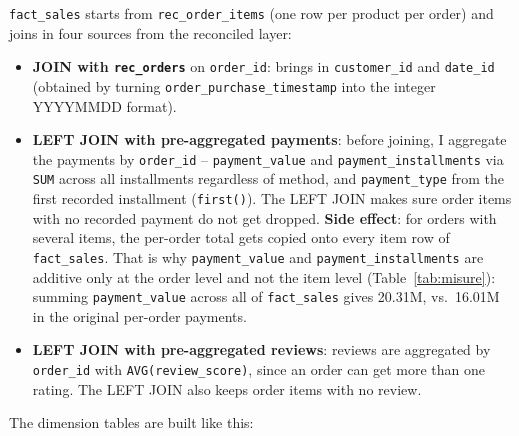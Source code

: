 \documentclass[12pt,a4paper]{article}
\begin{document}
\texttt{fact\_sales} starts from \texttt{rec\_order\_items} (one row per product per
order) and joins in four sources from the reconciled layer:

\begin{itemize}
\sloppy
  \item \textbf{JOIN with \texttt{rec\_orders}} on \texttt{order\_id}: brings in
        \texttt{customer\_id} and \texttt{date\_id} (obtained by turning
        \texttt{order\_purchase\_timestamp} into the integer YYYYMMDD format).

  \item \textbf{LEFT JOIN with pre-aggregated payments}: before joining, I aggregate
        the payments by \texttt{order\_id} -- \texttt{payment\_value} and
        \texttt{payment\_installments} via \texttt{SUM} across all installments
        regardless of method, and \texttt{payment\_type} from the first recorded
        installment (\texttt{first()}). The LEFT JOIN makes sure order items with no
        recorded payment do not get dropped. \textbf{Side effect}: for orders with
        several items, the per-order total gets copied onto every item row of
        \texttt{fact\_sales}. That is why \texttt{payment\_value} and
        \texttt{payment\_installments} are additive only at the order level and not
        the item level (Table~\ref{tab:misure}): summing \texttt{payment\_value}
        across all of \texttt{fact\_sales} gives 20.31M, vs.\ 16.01M in the original
        per-order payments.

  \item \textbf{LEFT JOIN with pre-aggregated reviews}: reviews are aggregated by
        \texttt{order\_id} with \texttt{AVG(review\_score)}, since an order can get
        more than one rating. The LEFT JOIN also keeps order items with no review.
\end{itemize}

The dimension tables are built like this:
\end{document}
